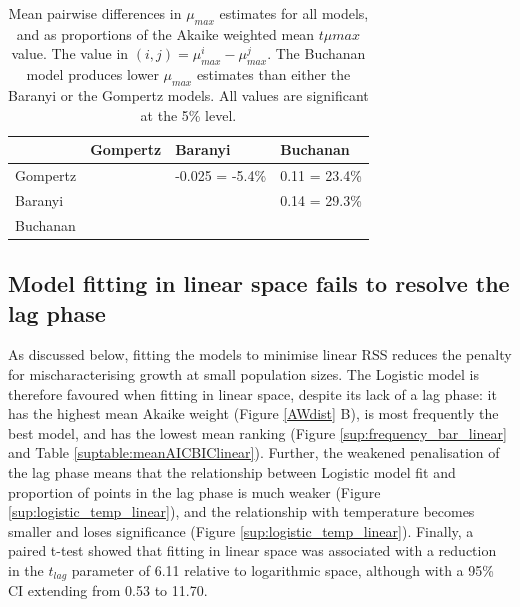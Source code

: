 \documentclass[11pt, a4paper]{article}
\begin{document}
\begin{linenumbers}
\begin{table}[H]
\centering
\begin{tabular}{l|lll}
         & Gompertz                                        & Baranyi                                         & Buchanan                 \\ \hline
Gompertz & \cellcolor[HTML]{9B9B9B}                        & -0.025 = -5.4\%                                           & 0.11 = 23.4\%                     \\
Baranyi  & \cellcolor[HTML]{9B9B9B}{\color[HTML]{9B9B9B} } & \cellcolor[HTML]{9B9B9B}{\color[HTML]{9B9B9B} } & 0.14 = 29.3\%                     \\
Buchanan & \cellcolor[HTML]{9B9B9B}{\color[HTML]{9B9B9B} } & \cellcolor[HTML]{9B9B9B}                        & \cellcolor[HTML]{9B9B9B}
\end{tabular}
\caption{Mean pairwise differences in $\mu_{max}$ estimates for all models, and as proportions of the Akaike weighted mean $t\mu{max}$ value. The value in $(i, j) = \mu_{max}^i - \mu_{max}^j$. The Buchanan model produces lower $\mu_{max}$ estimates than either the Baranyi or the Gompertz models. All values are significant at the 5\% level.}
\label{tab:rmax_biases}
\end{table}

\subsection{Model fitting in linear space fails to resolve the lag phase}
As discussed below, fitting the models to minimise linear RSS reduces the penalty for mischaracterising growth at small population sizes. The Logistic model is therefore favoured when fitting in linear space, despite its lack of a lag phase: it has the highest mean Akaike weight (Figure \ref{AWdist} B), is most frequently the best model, and has the lowest mean ranking (Figure \ref{sup:frequency_bar_linear} and Table \ref{suptable:meanAICBIClinear}). Further, the weakened penalisation of the lag phase means that the relationship between Logistic model fit and proportion of points in the lag phase is much weaker (Figure \ref{sup:logistic_temp_linear}), and the relationship with temperature becomes smaller and loses significance (Figure \ref{sup:logistic_temp_linear}). Finally, a paired t-test showed that fitting in linear space was associated with a reduction in the $t_{lag}$ parameter of 6.11 relative to logarithmic space, although with a 95\% CI extending from 0.53 to 11.70.




\end{linenumbers}
\end{document}
